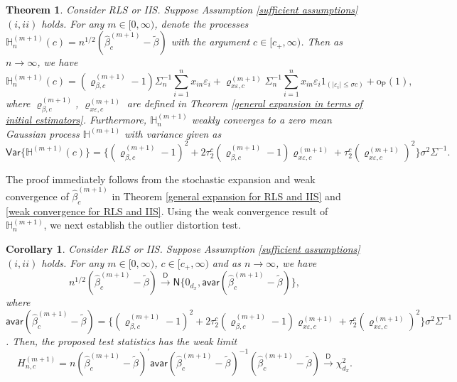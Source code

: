 \documentclass[11pt, letterpaper]{article}
\newtheorem{theorem}{Theorem}
\newtheorem{corollary}{Corollary}
\numberwithin{algorithm}{section}
\numberwithin{assumption}{section}
\numberwithin{lemma}{section}
\numberwithin{theorem}{section}
\numberwithin{corollary}{section}
\numberwithin{remark}{section}
\numberwithin{equation}{section}
\numberwithin{figure}{section}
\numberwithin{table}{section}
\begin{document}
\begin{theorem} \label{expansion and weak limit of processes of Hausman statistics}
Consider RLS or IIS. Suppose Assumption \ref{sufficient assumptions}$(i, ii)$ holds. For any $m \in [0, \infty)$, denote the processes $\mathbb{H}_{n}^{(m + 1)}(c) = n^{1/2} (\widehat{\beta}_{c}^{(m + 1)} - \widetilde{\beta})$ with the argument $c \in [c_{+}, \infty)$. Then as $n \to \infty$, we have
\begin{equation*}
\mathbb{H}_{n}^{(m + 1)}(c) = (\varrho_{\beta, c}^{(m + 1)} - 1) \Sigma_{n}^{-1} \sum_{i = 1}^{n} x_{in} \varepsilon_{i} + \varrho_{x \varepsilon, c}^{(m + 1)} \Sigma_{n}^{-1} \sum_{i = 1}^{n} x_{in} \varepsilon_{i} 1_{(|\varepsilon_{i}| \le \sigma c)} + \mathrm{o}_{\mathsf{P}}(1),
\end{equation*}
where $\varrho_{\beta, c}^{(m + 1)}$, $\varrho_{x \varepsilon, c}^{(m + 1)}$ are defined in Theorem \ref{general expansion in terms of initial estimators}. Furthermore, $\mathbb{H}_{n}^{(m + 1)}$ weakly converges to a zero mean Gaussian process $\mathbb{H}^{(m + 1)}$ with variance given as
\begin{equation*}
\mathsf{Var} \{ \mathbb{H}^{(m + 1)}(c) \} = \{ (\varrho_{\beta, c}^{(m + 1)} - 1)^{2} + 2 \tau_{2}^{c} (\varrho_{\beta, c}^{(m + 1)} - 1) \varrho_{x \varepsilon, c}^{(m + 1)} + \tau_{2}^{c} (\varrho_{x \varepsilon, c}^{(m + 1)})^{2} \} \sigma^{2} \Sigma^{-1}.
\end{equation*}
\end{theorem}

The proof immediately follows from the stochastic expansion and weak convergence of $\widehat{\beta}_{c}^{(m + 1)}$ in Theorem \ref{general expansion for RLS and IIS} and \ref{weak convergence for RLS and IIS}. Using the weak convergence result of $\mathbb{H}_{n}^{(m + 1)}$, we next establish the outlier distortion test.

\begin{corollary} \label{pointwise convergence of Hausman test statistics}
Consider RLS or IIS. Suppose Assumption \ref{sufficient assumptions}$(i, ii)$ holds. For any $m \in [0, \infty)$, $c \in [c_{+}, \infty)$ and as $n \to \infty$, we have
\begin{equation*}
n^{1/2} (\widehat{\beta}_{c}^{(m + 1)} - \widetilde{\beta}) \overset{\mathsf{D}}{\to} \mathsf{N}\{ 0_{d_{x}}, \mathsf{avar}(\widehat{\beta}_{c}^{(m + 1)} - \widetilde{\beta}) \},
\end{equation*}
where $\mathsf{avar}(\widehat{\beta}_{c}^{(m + 1)} - \widetilde{\beta}) = \{ (\varrho_{\beta, c}^{(m + 1)} - 1)^{2} + 2 \tau_{2}^{c} (\varrho_{\beta, c}^{(m + 1)} - 1) \varrho_{x \varepsilon, c}^{(m + 1)} + \tau_{2}^{c} (\varrho_{x \varepsilon, c}^{(m + 1)})^{2} \} \sigma^{2} \Sigma^{-1}$. Then, the proposed test statistics has the weak limit
\begin{equation*}
H_{n, c}^{(m + 1)} = n (\widehat{\beta}_{c}^{(m + 1)} - \widetilde{\beta})^{\prime} \mathsf{avar}(\widehat{\beta}_{c}^{(m + 1)} - \widetilde{\beta})^{-1} (\widehat{\beta}_{c}^{(m + 1)} - \widetilde{\beta}) \overset{\mathsf{D}}{\to} \chi^{2}_{d_{x}}.
\end{equation*}
\end{corollary}
\end{document}
